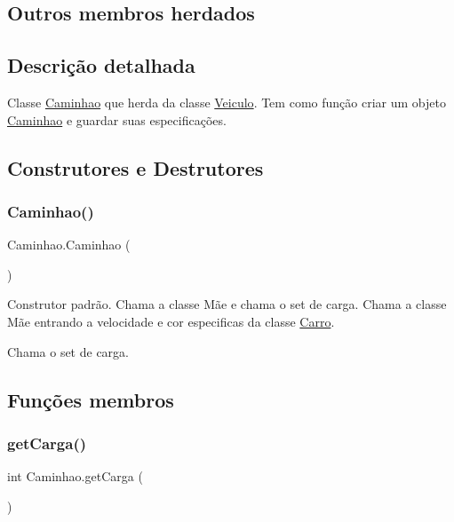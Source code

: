 \subsection*{Outros membros herdados}


\subsection{Descrição detalhada}
Classe \mbox{\hyperlink{class_caminhao}{Caminhao}} que herda da classe \mbox{\hyperlink{class_veiculo}{Veiculo}}. Tem como função criar um objeto \mbox{\hyperlink{class_caminhao}{Caminhao}} e guardar suas especificações. 

\subsection{Construtores e Destrutores}
\mbox{\label{class_caminhao_af533c39b3db0b14e7c404d4d91a88e47}} 
\subsubsection{\texorpdfstring{Caminhao()}{Caminhao()}}
{\footnotesize\ttfamily Caminhao.\+Caminhao (\begin{DoxyParamCaption}{ }\end{DoxyParamCaption})\hspace{0.3cm}{\ttfamily [inline]}}

Construtor padrão. Chama a classe Mãe e chama o set de carga. Chama a classe Mãe entrando a velocidade e cor especificas da classe \mbox{\hyperlink{class_carro}{Carro}}.

Chama o set de carga. 

\subsection{Funções membros}
\mbox{\label{class_caminhao_a72a337da0709d0d44385f9a3adc94848}} 
\subsubsection{\texorpdfstring{get\+Carga()}{getCarga()}}
{\footnotesize\ttfamily int Caminhao.\+get\+Carga (\begin{DoxyParamCaption}{ }\end{DoxyParamCaption})\hspace{0.3cm}{\ttfamily [inline]}}

